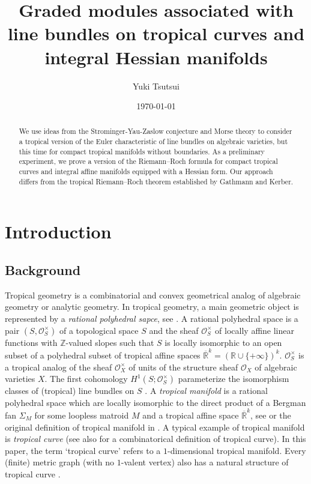 \documentclass[a4paper,dvipdfmx,reqno,12pt]{amsart}
\title{Graded modules associated with line bundles on 
tropical curves and integral Hessian manifolds}
\author[Y. Tsutsui]{Yuki Tsutsui}
\date{\today}
\theoremstyle{definition}
\numberwithin{equation}{section}
\begin{document}
\begin{abstract}
We use ideas from the Strominger-Yau-Zaslow conjecture and 
Morse theory to consider a tropical version of the Euler 
characteristic of line bundles on algebraic varieties, 
but this time for compact tropical manifolds without 
boundaries. As a preliminary experiment,
we prove a version of the Riemann--Roch formula 
for compact tropical curves and integral affine 
manifolds equipped with a Hessian form. 
Our approach differs from the tropical Riemann--Roch 
theorem established by Gathmann and Kerber.
\end{abstract}
\maketitle
\section{Introduction}

\subsection{Background}

Tropical geometry is a combinatorial and convex 
geometrical analog of
algebraic geometry or analytic geometry.
In tropical geometry,
a main geometric object is represented by 
a \emph{rational polyhedral sapce}, see 
\cite[Definition 2.2]{gross2019sheaftheoretic}. 
A rational polyhedral space is a pair 
$(S,\mathcal{O}^{\times}_S)$ of a 
topological space $S$ and 
the sheaf $\mathcal{O}^{\times}_S$ of 
locally affine linear functions with 
$\mathbb{Z}$-valued slopes such that 
$S$ is locally isomorphic to an open subset
of a polyhedral subset of tropical affine 
spaces $\overline{\mathbb{R}}^{k}=
(\mathbb{R}\cup\{+\infty\})^{k}$.
$\mathcal{O}_S^{\times}$ is a tropical analog
of the sheaf $\mathcal{O}_X^{\times}$ of 
units of the structure sheaf $\mathcal{O}_X$ of 
algebraic varieties $X$.
The first cohomology 
$H^{1}(S;\mathcal{O}_S^{\times})$ parameterize the 
isomorphism classes of (tropical) line bundles on $S$
\cite[Proposition 3.13]{gross2019sheaftheoretic}.
A \emph{tropical manifold} is 
a rational polyhedral space which are locally 
isomorphic to the direct product of a 
Bergman fan $\Sigma_M$ for some loopless 
matroid $M$ and a tropical affine space 
$\overline{\mathbb{R}}^{k}$,
see \cite[Definition 6.1]{gross2019sheaftheoretic} 
or the original definition of tropical manifold 
in \cite[Definition 1.14]{mikhalkinTropicalEigenwaveIntermediate2014a}.
A typical example of tropical manifold is 
\emph{tropical curve}
\cite[Definition 3.1]{mikhalkinTropicalCurvesTheir2008a}
(see also \cite[Definition 1.1]{gathmannRiemannRochTheoremTropical2008a}
for a combinatorical definition of tropical curve).
In this paper, the term `tropical curve' refers to a 
$1$-dimensional tropical manifold.
Every (finite) metric graph 
(with no $1$-valent vertex) also has 
a natural structure of tropical curve 
\cite[Proposition 3.6]{mikhalkinTropicalCurvesTheir2008a}.
\end{document}
